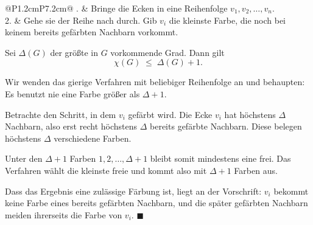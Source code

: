 \begin{merksatz}
\begin{center}
\renewcommand{\arraystretch}{1.5}
\begin{tabular}{@{}P{1.2cm}P{7.2cm}@{}}
. & Bringe die Ecken in eine Reihenfolge $v_1, v_2, \ldots, v_n$.\\
2. & Gehe sie der Reihe nach durch. Gib $v_i$ die kleinste Farbe, die noch bei keinem bereits gefärbten Nachbarn vorkommt.\\
\bottomrule
\end{tabular}
\end{center}
\end{merksatz}

\begin{merksatz}
Sei $\Delta(G)$ der größte in $G$ vorkommende Grad. Dann gilt
\[ \chi(G) \;\le\; \Delta(G) + 1 . \]

Wir wenden das gierige Verfahren mit beliebiger Reihenfolge an und behaupten: Es benutzt nie eine Farbe größer als $\Delta + 1$.

Betrachte den Schritt, in dem $v_i$ gefärbt wird. Die Ecke $v_i$ hat höchstens $\Delta$ Nachbarn, also erst recht höchstens $\Delta$ bereits gefärbte Nachbarn. Diese belegen höchstens $\Delta$ verschiedene Farben.

Unter den $\Delta + 1$ Farben $1, 2, \ldots, \Delta+1$ bleibt somit mindestens eine frei. Das Verfahren wählt die kleinste freie und kommt also mit $\Delta+1$ Farben aus.

Dass das Ergebnis eine zulässige Färbung ist, liegt an der Vorschrift: $v_i$ bekommt keine Farbe eines bereits gefärbten Nachbarn, und die später gefärbten Nachbarn meiden ihrerseits die Farbe von $v_i$. $\blacksquare$
\end{merksatz}

